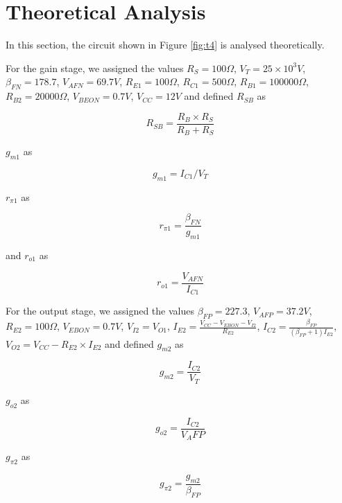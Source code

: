 \section{Theoretical Analysis}
\label{sec:analysis}

In this section, the circuit shown in Figure \ref{fig:t4} is analysed 
theoretically.

For the gain stage, we assigned the values $R_S=100\Omega$, $V_T=25\times 10^3 V$, $\beta _{FN}=178.7 $, $V_{AFN}=69.7 V$, $R_{E1}=100 \Omega$, $R_{C1}=500 \Omega$, $R_{B1}=100000 \Omega$, $R_{B2}=20000 \Omega$, $V_{BEON}=0.7 V$, $V_{CC}=12 V$ and defined $R_{SB}$ as

\begin{equation*} \label{eq1}
R_{SB}=\frac{R_B\times R_S}{R_B+R_S}
\end{equation*}

$g_{m1}$ as

\begin{equation*} \label{eq2}
g_{m1}=I_{C1}/V_T
\end{equation*}

$r_{\pi 1}$ as

\begin{equation*} \label{eq3}
r_{\pi 1}=\frac{\beta _{FN}}{g_{m1}}
\end{equation*}

and $r_{o1}$ as

\begin{equation*} \label{eq4}
r_{o1}=\frac{V_{AFN}}{I_{C1}}
\end{equation*}

For the output stage, we assigned the values $\beta _{FP} = 227.3$, $V_{AFP} = 37.2 V$, $R_{E2} = 100 \Omega$, $V_{EBON} = 0.7 V$, $V_{I2} = V_{O1}$, $I_{E2} = \frac{V_{CC}-V_{EBON}-V_{I2}}{R_{E2}}$, $I_{C2} = \frac{\beta _{FP}}{(\beta _{FP}+1)I_{E2}}$,
$V_{O2} = V_{CC} - R_{E2}\times I_{E2}$ and defined $g_{m2}$ as

\begin{equation*} \label{eq7}
g_{m2} = \frac{I_{C2}}{V_T}
\end{equation*}

$g_{o2}$ as

\begin{equation*} \label{eq8}
g_{o2} = \frac{I_{C2}}{V_AFP}
\end{equation*}

$g_{\pi 2}$ as

\begin{equation*} \label{eq9}
g_{\pi 2} = \frac{g_{m2}}{\beta _{FP}}
\end{equation*}

